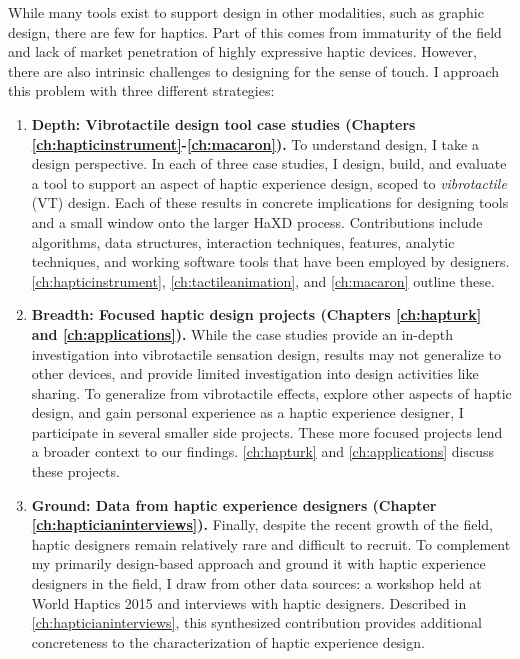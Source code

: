 While many tools exist to support design in other modalities, such as graphic design, there are few for haptics.
Part of this comes from immaturity of the field and lack of market penetration of highly expressive haptic devices.
However, there are also intrinsic challenges to designing for the sense of touch.
I approach this problem with three different strategies:
\begin{enumerate}
\item \textbf{Depth: Vibrotactile design tool case studies (Chapters \ref{ch:hapticinstrument}-\ref{ch:macaron}).}
To understand design, I take a design perspective.
In each of three case studies, I design, build, and evaluate a tool to support an aspect of haptic experience design, scoped to \emph{vibrotactile} (VT) design.
Each of these results in concrete implications for designing tools and a small window onto the larger HaXD process.
Contributions include algorithms, data structures, interaction techniques, features, analytic techniques, and working software tools that have been employed by designers.
\autoref{ch:hapticinstrument}, \autoref{ch:tactileanimation}, and \autoref{ch:macaron} outline these.

\item \textbf{Breadth: Focused haptic design projects (Chapters \ref{ch:hapturk} and \ref{ch:applications}).}
While the case studies provide an in-depth investigation into vibrotactile sensation design, results may not generalize to other devices, and provide limited investigation into design activities like sharing.
To generalize from vibrotactile effects, explore other aspects of haptic design, and gain personal experience as a haptic experience designer, I participate in several smaller side projects.
These more focused projects lend a broader context to our findings.
\autoref{ch:hapturk} and \autoref{ch:applications} discuss these projects.

\item \textbf{Ground: Data from haptic experience designers (Chapter \ref{ch:hapticianinterviews}).}
Finally, despite the recent growth of the field, haptic designers remain relatively rare and difficult to recruit.
To complement my primarily design-based approach and ground it with haptic experience designers in the field, I draw from other data sources: a workshop held at World Haptics 2015 and interviews with haptic designers.
Described in \autoref{ch:hapticianinterviews}, this synthesized contribution provides additional concreteness to the characterization of haptic experience design.
\end{enumerate}




